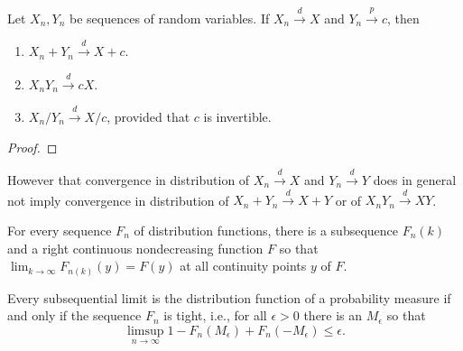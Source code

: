 \begin{theorem} \label{thm:slutsky-theorem}
    Let $X_{n}, Y_{n}$ be sequences of random variables. If $X_{n}\stackrel{d}{\rightarrow}X$ and $Y_{n}\stackrel{p}{\rightarrow}c$, then
    \begin{enumerate}
        \item $X_{n}+Y_{n}\stackrel{d}{\rightarrow}X+c$.
        \item $X_{n}Y_{n}\stackrel{d}{\rightarrow}cX$.
        \item $X_{n}/Y_{n}\stackrel{d}{\rightarrow}X/c$, provided that $c$ is invertible.
    \end{enumerate}
\end{theorem}

\begin{proof}

\end{proof}

\begin{note}
    However that convergence in distribution of $X_{n}\stackrel{d}{\rightarrow}X$ and $Y_{n}\stackrel{d}{\rightarrow}Y$ does in general not imply convergence in distribution of $X_n+Y_n\stackrel{d}{\rightarrow}X+Y$ or of $X_nY_n\stackrel{d}{\rightarrow}XY$.
\end{note}

\begin{theorem} \label{thm:cramer-wold-theorem}

\end{theorem}


\begin{theorem}
    For every sequence $F_{n}$ of distribution functions, there is a subsequence $F_{n}(k)$ and a right continuous nondecreasing function $F$ so that $\lim_{k\rightarrow\infty}F_{n(k)}(y)=F(y)$ at all continuity points $y$ of $F$.
\end{theorem}

\begin{theorem}
    Every subsequential limit is the distribution function of a probability measure if and only if the sequence $F_{n}$ is tight, i.e., for all $\epsilon>0$ there is an $M_{\epsilon}$ so that
    \begin{equation}
        \limsup_{n\rightarrow\infty}1-F_{n}\left(M_{\epsilon}\right)+F_{n}\left(-M_{\epsilon}\right)\leq\epsilon.
    \end{equation}
\end{theorem}

